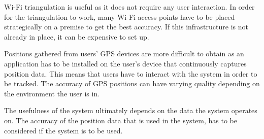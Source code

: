 Wi-Fi triangulation is useful as it does not require any user interaction. In order for the triangulation to work, many Wi-Fi access points have to be placed strategically on a premise to get the best accuracy. If this infrastructure is not already in place, it can be expensive to set up.

Positions gathered from users' GPS devices are more difficult to obtain as an application has to be installed on the user's device that continuously captures position data. This means that users have to interact with the system in order to be tracked. The accuracy of GPS positions can have varying quality depending on the environment the user is in.

The usefulness of the system ultimately depends on the data the system operates on. The accuracy of the position data that is used in the system, has to be considered if the system is to be used.